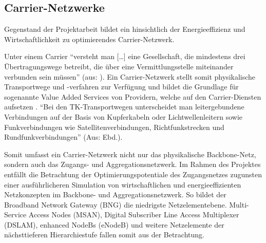 \documentclass[12pt,titlepage]{article}
\begin{document}
\subsection{Carrier-Netzwerke} 

%

Gegenstand der Projektarbeit bildet ein hinsichtlich der Energieeffizienz und Wirtschaftlichkeit zu optimierendes Carrier-Netzwerk.

Unter einem Carrier "`versteht man […] eine Gesellschaft, die mindestens drei Übertra\-gungs\-wege betreibt, die über eine Vermittlungsstelle miteinander verbunden sein müssen"' (aus: \cite{carrier}). Ein Carrier-Netzwerk stellt somit physikalische Transportwege und -verfahren zur Verfügung und bildet die Grundlage für sogenannte Value Added Services von Providern, welche auf den Carrier-Diensten aufsetzen \cite{fassnacht}. "`Bei den TK-Transportwegen unterscheidet man leitergebundene Verbindungen auf der Basis von Kupferkabeln oder Lichtwellenleitern sowie Funkverbindungen wie Satellitenverbindungen, Richtfunkstrecken und Rundfunkverbindungen"' (Aus: Ebd.).%

Somit umfasst ein Carrier-Netzwerk nicht nur das physikalische Backbone-Netz, sondern auch das Zugangs- und Aggregationsnetzwerk. Im Rahmen des Projektes entfällt die Betrachtung der Optimierungspotentiale des Zugangsnetzes zugunsten einer aus\-führ\-lich\-eren Simulation von wirtschaftlichen und energieeffizienten Netzkonzepten im Backbone- und Aggregationsnetzwerk. So bildet der Broadband Network Gateway (BNG) die niedrigste Netzelementebene. Multi-Service Access Nodes (MSAN), Digital Subscriber Line Access Multiplexer (DSLAM), enhanced NodeBs (eNodeB) und weitere Netzelemente der nächsttieferen Hierarchiestufe fallen somit aus der Betrachtung.
\end{document}
